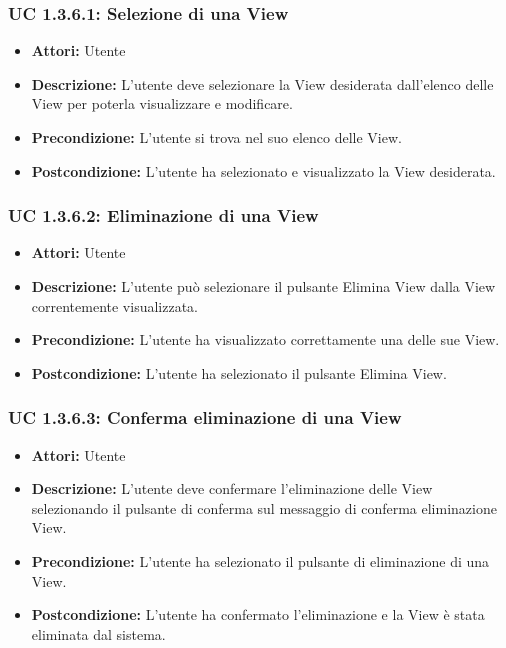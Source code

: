 \subsubsection{UC 1.3.6.1: Selezione di una View}

\begin{itemize}
\item \textbf{Attori:} Utente
\item \textbf{Descrizione:} L'utente deve selezionare la View desiderata dall'elenco delle View per poterla visualizzare e modificare.
\item \textbf{Precondizione:} L'utente si trova nel suo elenco delle View.
\item \textbf{Postcondizione:} L'utente ha selezionato e visualizzato la View desiderata.
\end{itemize}

\subsubsection{UC 1.3.6.2: Eliminazione di una View}

\begin{itemize}
\item \textbf{Attori:} Utente
\item \textbf{Descrizione:} L'utente può selezionare il pulsante Elimina View dalla View correntemente visualizzata.
\item \textbf{Precondizione:} L'utente ha visualizzato correttamente una delle sue View.
\item \textbf{Postcondizione:} L'utente ha selezionato il pulsante Elimina View.
\end{itemize}

\subsubsection{UC 1.3.6.3: Conferma eliminazione di una View}

\begin{itemize}
\item \textbf{Attori:} Utente
\item \textbf{Descrizione:} L'utente deve confermare l'eliminazione delle View selezionando il pulsante di conferma sul messaggio di conferma eliminazione View.
\item \textbf{Precondizione:} L'utente ha selezionato il pulsante di eliminazione di una View.
\item \textbf{Postcondizione:} L'utente ha confermato l'eliminazione e la View è stata eliminata dal sistema.
\end{itemize}




